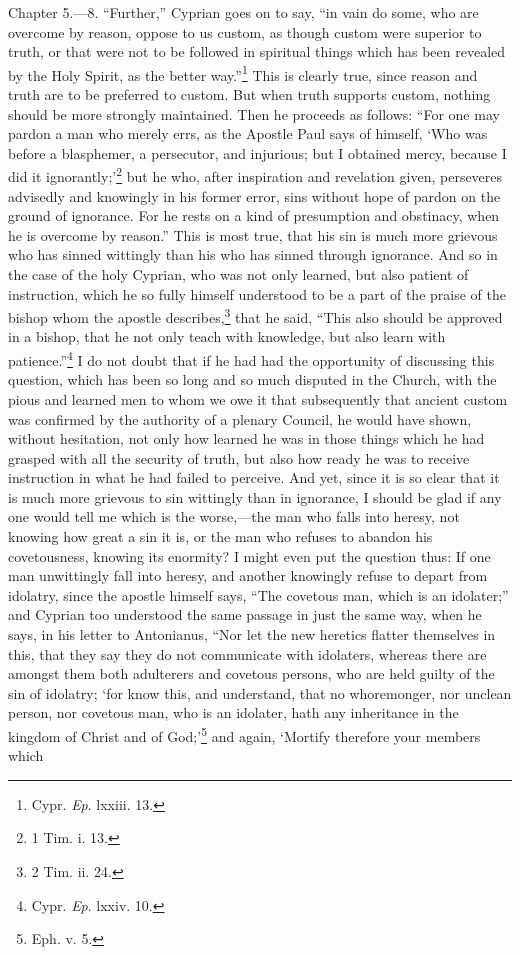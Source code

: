 Chapter 5.—8. ``Further,'' Cyprian goes on to say, ``in vain do some, who are overcome by reason, oppose to us custom, as though custom were superior to truth, or that were not to be followed in spiritual things which has been revealed by the Holy Spirit, as the better way.''\footnote{\par  Cypr. \emph{Ep}. lxxiii. 13.} This is clearly true, since reason and truth are to be preferred to custom. But when truth supports custom, nothing should be more strongly maintained. Then he proceeds as follows: ``For one may pardon a man who merely errs, as the Apostle Paul says of himself, ‘Who was before a blasphemer, a persecutor, and injurious; but I obtained mercy, because I did it ignorantly;’\footnote{\par  1 Tim. i. 13.} but he who, after inspiration and revelation given, perseveres advisedly and knowingly in his former error, sins without hope of pardon on the ground of ignorance. For he rests on a kind of presumption and obstinacy, when he is overcome by reason.'' This is most true, that his sin is much more grievous who has sinned wittingly than his who has sinned through ignorance. And so in the case of the holy Cyprian, who was not only learned, but also patient of instruction, which he so fully himself understood to be a part of the praise of the bishop whom the apostle describes,\footnote{\par  2 Tim. ii. 24.} that he said, ``This also should be approved in a bishop, that he not only teach with knowledge, but also learn with patience.''\footnote{\par  Cypr. \emph{Ep}. lxxiv. 10.} I do not doubt that if he had had the opportunity of discussing this question, which has been so long and so much disputed in the Church, with the pious and learned men to whom we owe it that subsequently that ancient custom was confirmed by the authority of a plenary Council, he would have shown, without hesitation, not only how learned he was in those things which he had grasped with all the security of truth, but also how ready he was to receive instruction in what he had failed to perceive. And yet, since it is so clear that it is much more grievous to sin wittingly than in ignorance, I should be glad if any one would tell me which is the worse,—the man who falls into heresy, not knowing how great a sin it is, or the man who refuses to abandon his covetousness, knowing its enormity? I might even put the question thus: If one man unwittingly fall into heresy, and another knowingly refuse to depart from idolatry, since the apostle himself says, ``The covetous man, which is an idolater;'' and Cyprian too understood the same passage in just the same way, when he says, in his letter to Antonianus, ``Nor let the new heretics flatter themselves in this, that they say they do not communicate with idolaters, whereas there are amongst them both adulterers and covetous persons, who are held guilty of the sin of idolatry; ‘for know this, and understand, that no whoremonger, nor unclean person, nor covetous man, who is an idolater, hath any inheritance in the kingdom of Christ and of God;’\footnote{\par  Eph. v. 5.} and again, ‘Mortify therefore your members which 